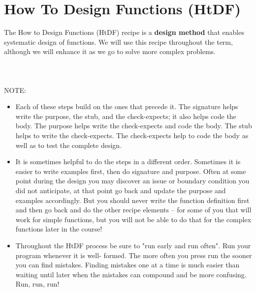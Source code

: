 \documentclass[11pt,a4paper]{report}
\begin{document}
	\chapter{How To Design Functions (HtDF)} \label{ch:htdf}
	The How to Design Functions (HtDF) recipe is a \textbf{design method} that enables systematic design of functions.
	 We will use this recipe throughout the term, although we will enhance it as we go to solve more complex problems.
	\\ \\
	\\ \\
	NOTE:
	\begin{itemize}
		\item Each of these steps build on the ones that precede it. The signature helps write the purpose, the stub, and
		the check-expects; it also helps code the body. The purpose helps write the check-expects and code the
		body. The stub helps to write the check-expects. The check-expects help to code the body as well as to
		test the complete design.
		
		\item It is sometimes helpful to do the steps in a different order. Sometimes it is easier to write examples first,
		then do signature and purpose. Often at some point during the design you may discover an issue or
		boundary condition you did not anticipate, at that point go back and update the purpose and examples
		accordingly. But you should never write the function definition first and then go back and do the other
		recipe elements -- for some of you that will work for simple functions, but you will not be able to do that for
		the complex functions later in the course!
		
		\item Throughout the HtDF process be sure to "run early and run often". Run your program whenever it is well-
		formed. The more often you press run the sooner you can find mistakes. Finding mistakes one at a time is
		much easier than waiting until later when the mistakes can compound and be more confusing. Run, run, run!
	\end{itemize}
\end{document}
